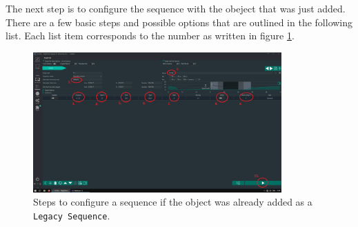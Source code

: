 \documentclass[a4paper, 11pt, fleqn]{memoir}
\begin{document}
The next step is to configure the sequence with the obeject that was just added. There are a few basic steps and possible options that are outlined in the following list. Each list item corresponds to the number as written in figure \ref{fig:NINA:configure_sequence_edited}.

\begin{figure}
    \centering
    \includegraphics[width=0.85\textwidth]{figures/NINA/configure_sequence_edited.png}
    \caption{Steps to configure a sequence if the object was already added as a \texttt{Legacy Sequence}.}
    \label{fig:NINA:configure_sequence_edited}
\end{figure}
\end{document}
